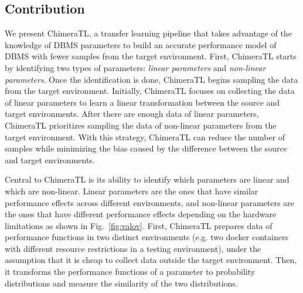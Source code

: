 \subsection{Contribution}
We present ChimeraTL, a transfer learning pipeline that takes advantage of the knowledge of DBMS parameters to build an accurate performance model of DBMS with fewer samples from the target environment.
First, ChimeraTL starts by identifying two types of parameters: \textit{linear parameters} and \textit{non-linear parameters}.
Once the identification is done, ChimeraTL begins sampling the data from the target environment.
Initially, ChimeraTL focuses on collecting the data of linear parameters to learn a linear transformation between the source and target environments.
After there are enough data of linear parameters, ChimeraTL prioritizes sampling the data of non-linear parameters from the target environment.
With this strategy, ChimeraTL can reduce the number of samples while minimizing the bias caused by the difference between the source and target environments.

Central to ChimeraTL is its ability to identify which parameters are linear and which are non-linear.
Linear parameters are the ones that have similar performance effects across different environments, and non-linear parameters are the ones that have different performance effects depending on the hardware limitations as shown in Fig.~\ref{fig:valov}.
First, ChimeraTL prepares data of performance functions in two distinct environments (e.g. two docker containers with different resource restrictions in a testing environment), under the assumption that it is cheap to collect data outside the target environment. 
Then, it transforms the performance functions of a parameter to probability distributions and measure the similarity of the two distributions. 

